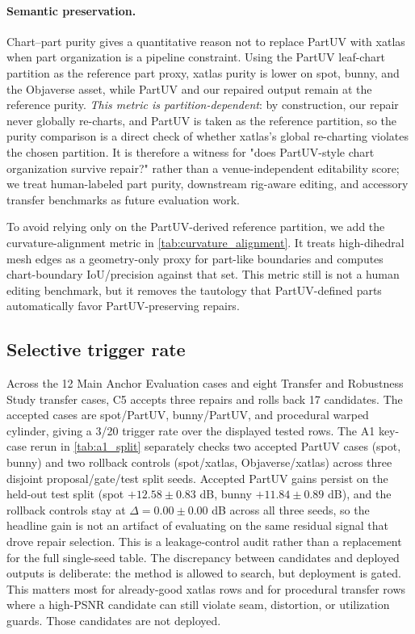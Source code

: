 \paragraph*{Semantic preservation.}

Chart--part purity gives a quantitative reason not to replace PartUV with xatlas when part organization is a pipeline constraint. Using the PartUV leaf-chart partition as the reference part proxy, xatlas purity is lower on spot, bunny, and the Objaverse asset, while PartUV and our repaired output remain at the reference purity. \emph{This metric is partition-dependent}: by construction, our repair never globally re-charts, and PartUV is taken as the reference partition, so the purity comparison is a direct check of whether xatlas's global re-charting violates the chosen partition. It is therefore a witness for "does PartUV-style chart organization survive repair?" rather than a venue-independent editability score; we treat human-labeled part purity, downstream rig-aware editing, and accessory transfer benchmarks as future evaluation work.

To avoid relying only on the PartUV-derived reference partition, we add the curvature-alignment metric in \cref{tab:curvature_alignment}. It treats high-dihedral mesh edges as a geometry-only proxy for part-like boundaries and computes chart-boundary IoU/precision against that set. This metric still is not a human editing benchmark, but it removes the tautology that PartUV-defined parts automatically favor PartUV-preserving repairs.

\subsection{Selective trigger rate}
\label{sec:selective_trigger}

Across the 12 Main Anchor Evaluation cases and eight Transfer and Robustness Study transfer cases, C5 accepts three repairs and rolls back 17 candidates. The accepted cases are spot/PartUV, bunny/PartUV, and procedural warped cylinder, giving a 3/20 trigger rate over the displayed tested rows. The A1 key-case rerun in \cref{tab:a1_split} separately checks two accepted PartUV cases (spot, bunny) and two rollback controls (spot/xatlas, Objaverse/xatlas) across three disjoint proposal/gate/test split seeds. Accepted PartUV gains persist on the held-out test split (spot $+12.58 \pm 0.83$ dB, bunny $+11.84 \pm 0.89$ dB), and the rollback controls stay at $\Delta = 0.00 \pm 0.00$ dB across all three seeds, so the headline gain is not an artifact of evaluating on the same residual signal that drove repair selection. This is a leakage-control audit rather than a replacement for the full single-seed table. The discrepancy between candidates and deployed outputs is deliberate: the method is allowed to search, but deployment is gated. This matters most for already-good xatlas rows and for procedural transfer rows where a high-PSNR candidate can still violate seam, distortion, or utilization guards. Those candidates are not deployed.

